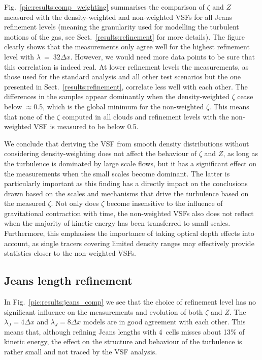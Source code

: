 Fig.~\ref{pic:results:comp_weighting} summarises the comparison of $\zeta$ and $Z$ measured with the density-weighted and non-weighted VSFs for all Jeans refinement levels (meaning the granularity used for modelling the turbulent motions of the gas, see Sect.~\ref{results:refinement} for more details).
The figure clearly shows that the measurements only agree well for the highest refinement level with $\lambda~=~32\Delta x$.
However, we would need more data points to be sure that this correlation is indeed real.
At lower refinement levels the measurements, as those used for the standard analysis and all other test scenarios but the one presented in Sect.~\ref{results:refinement}, correlate less well with each other. 
The differences in the samples appear dominantly when the density-weighted $\zeta$ cease below $\approx$0.5, which is the global minimum for the non-weighted $\zeta$. 
This means that none of the $\zeta$ computed in all clouds and refinement levels with the non-weighted VSF is measured to be below 0.5.

We conclude that deriving the VSF from smooth density distributions without considering density-weighting does not affect the behaviour of $\zeta$ and $Z$, as long as the turbulence is dominated by large scale flows, but it has a significant effect on the measurements when the small scales become dominant.
The latter is particularly important as this finding has a directly impact on the conclusions drawn based on the scales and mechanisms that drive the turbulence based on the measured $\zeta$.
Not only does $\zeta$ become insensitive to the influence of gravitational contraction with time, the non-weighted VSFs also does not reflect when the majority of kinetic energy has been transferred to small scales. 
Furthermore, this emphasises the importance of taking optical depth effects into account, as single tracers covering limited density ranges may effectively provide statistics closer to the non-weighted VSFs.



\subsection{Jeans length refinement}\label{discussion:refinement}

In Fig.~\ref{pic:results:jeans_comp} we see that the choice of refinement level has no significant influence on the measurements and evolution of both $\zeta$ and $Z$. 
The $\lambda_J=4\Delta{}x$ and $\lambda_J=8\Delta{}x$ models are in good agreement with each other.
This means that, although refining Jeans lengths with 4~cells misses about 13\% of kinetic energy, the effect on the structure and behaviour of the turbulence is rather small and not traced by the VSF analysis.

